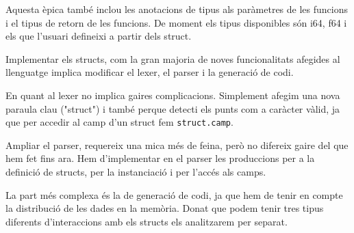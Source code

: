 ﻿\documentclass{article}
\begin{document}
Aquesta èpica també inclou les anotacions de tipus als paràmetres de les funcions
i el tipus de retorn de les funcions. De moment els tipus disponibles són i64,
f64 i els que l'usuari defineixi a partir dels struct.

Implementar els structs, com la gran majoria de noves funcionalitats afegides al
llenguatge implica modificar el lexer, el parser i la generació de codi. 

En quant al lexer no implica gaires complicacions. Simplement afegim una nova
paraula clau ("struct") i també perque detecti els punts com a caràcter vàlid,
ja que per accedir al camp d'un struct fem \texttt{struct.camp}.

Ampliar el parser, requereix una mica més de feina, però no difereix gaire del
que hem fet fins ara. Hem d'implementar en el parser les produccions per a la
definició de structs, per la instanciació i per l'accés als camps.

La part més complexa és la de generació de codi, ja que hem de tenir en compte
la distribució de les dades en la memòria. Donat que podem tenir tres tipus
diferents d'interaccions amb els structs els analitzarem per separat.
\end{document}
